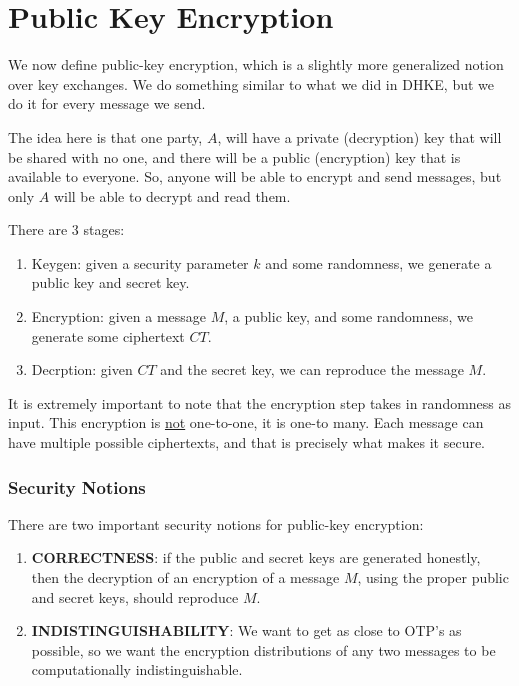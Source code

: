 \documentclass[11pt]{article}
\begin{document}
\newpage
\section{Public Key Encryption}
We now define public-key encryption, which is a slightly more generalized notion over key exchanges.
We do something similar to what we did in DHKE, but we do it for every message we send.\smallskip

The idea here is that one party, \(A\), will have a private (decryption) key that will be shared with no one,
and there will be a public (encryption) key that is available to everyone. 
So, anyone will be able to  encrypt and send messages, but only \(A\) will be able to decrypt and read them.\smallskip

There are 3 stages:
\begin{enumerate}
\item Keygen: given a security parameter \(k\) and some randomness, we generate a public key and secret key.
\item Encryption: given a message \(M\), a public key, and some randomness, we generate some ciphertext \(CT\).
\item Decrption: given \(CT\) and the secret key, we can reproduce the message \(M\).
\end{enumerate}

It is extremely important to note that the encryption step takes in randomness as input. 
This encryption is \underline{not} one-to-one, it is one-to many. 
Each message can have multiple possible ciphertexts, and that is precisely what makes it secure.

\subsubsection{Security Notions}
There are two important security notions for public-key encryption:

\begin{enumerate}
\item \textbf{CORRECTNESS}: if the public and secret keys are generated honestly, then the decryption of an encryption of a message \(M\), using the proper public and secret keys, should reproduce \(M\).
\item \textbf{INDISTINGUISHABILITY}: We want to get as close to OTP's as possible, so we want the encryption distributions of any two messages to be computationally indistinguishable.
\end{enumerate}
\end{document}
